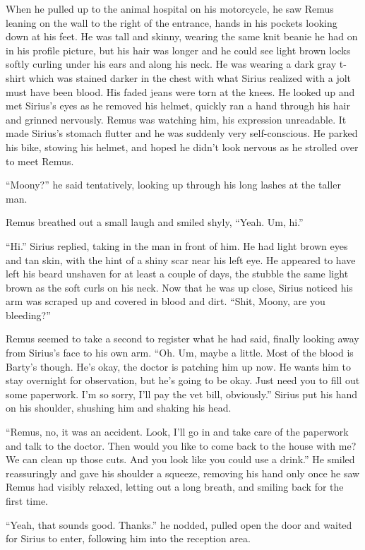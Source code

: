 \documentclass[12pt,twoside,openright]{memoir}
\begin{document}
When he pulled up to the animal hospital on his motorcycle, he saw Remus leaning on the wall to the right of the entrance, hands in his pockets looking down at his feet. He was tall and skinny, wearing the same knit beanie he had on in his profile picture, but his hair was longer and he could see light brown locks softly curling under his ears and along his neck. He was wearing a dark gray t-shirt which was stained darker in the chest with what Sirius realized with a jolt must have been blood. His faded jeans were torn at the knees. He looked up and met Sirius's eyes as he removed his helmet, quickly ran a hand through his hair and grinned nervously. Remus was watching him, his expression unreadable. It made Sirius's stomach flutter and he was suddenly very self-conscious. He parked his bike, stowing his helmet, and hoped he didn't look nervous as he strolled over to meet Remus.

``Moony?'' he said tentatively, looking up through his long lashes at the taller man.

Remus breathed out a small laugh and smiled shyly, ``Yeah. Um, hi.''

``Hi.'' Sirius replied, taking in the man in front of him. He had light brown eyes and tan skin, with the hint of a shiny scar near his left eye. He appeared to have left his beard unshaven for at least a couple of days, the stubble the same light brown as the soft curls on his neck. Now that he was up close, Sirius noticed his arm was scraped up and covered in blood and dirt. ``Shit, Moony, are you bleeding?''

Remus seemed to take a second to register what he had said, finally looking away from Sirius's face to his own arm. ``Oh. Um, maybe a little. Most of the blood is Barty's though. He's okay, the doctor is patching him up now. He wants him to stay overnight for observation, but he's going to be okay. Just need you to fill out some paperwork. I'm so sorry, I'll pay the vet bill, obviously.'' Sirius put his hand on his shoulder, shushing him and shaking his head.

``Remus, no, it was an accident. Look, I'll go in and take care of the paperwork and talk to the doctor. Then would you like to come back to the house with me? We can clean up those cuts. And you look like you could use a drink.'' He smiled reassuringly and gave his shoulder a squeeze, removing his hand only once he saw Remus had visibly relaxed, letting out a long breath, and smiling back for the first time.

``Yeah, that sounds good. Thanks.'' he nodded, pulled open the door and waited for Sirius to enter, following him into the reception area.
\end{document}

